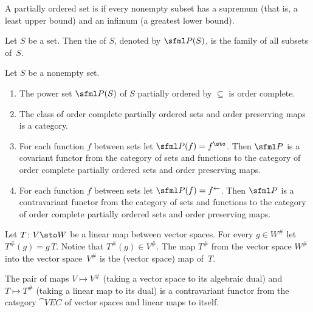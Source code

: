 \begin{defn} A partially ordered set is
 if every nonempty subset has a supremum (that is, a least upper
bound) and an infimum (a greatest lower bound).
\end{defn}

\begin{defn} Let $S$ be a set.  Then the
 of $S$, denoted by $\sfml P(S)$, is the family of all subsets of~$S$.
\end{defn}

\begin{exam} Let $S$ be a nonempty set.
 \begin{enumerate}
  \item The power set $\sfml P(S)$ of $S$ partially ordered by $\subseteq$ is
order complete.
  \item The class of order complete partially ordered sets and order
preserving maps is a category.
  \item For each function $f$ between sets let $\sfml P(f) = f^{\sto}$. Then
$\sfml P$ is a covariant functor from the category of sets and functions to the category
of order complete partially ordered sets and order preserving maps.
  \item For each function $f$ between sets let $\sfml P(f) = f^{\gets}$. Then
$\sfml P$ is a contravariant functor from the category of sets and functions to the
category of order complete partially ordered sets and order preserving maps.
 \end{enumerate}
\end{exam}

\begin{defn}\label{defn_vsp_adjoint} Let $T\colon V \sto W$ be a linear map between vector spaces. For every
$g \in W^{\#}$ let $T^{\#}(g) = g\,T$.  Notice that $T^{\#}(g) \in V^{\#}$.  The map $T^{\#}$ from the
vector space $W^{\#}$ into the vector space~$V^{\#}$ is the (vector space)
 map of~$T$.
\end{defn}

\begin{exam} The pair of maps $V \mapsto V^{\#}$ (taking a vector space to its algebraic dual) and
$T \mapsto T^{\#}$ (taking a linear map to its dual) is a contravariant functor from the category $\cat{VEC}$
of vector spaces and linear maps to itself.
\end{exam}

